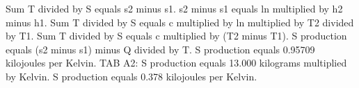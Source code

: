 Sum T divided by S equals s2 minus s1.  
s2 minus s1 equals ln multiplied by h2 minus h1.  
Sum T divided by S equals c multiplied by ln multiplied by T2 divided by T1.  
Sum T divided by S equals c multiplied by (T2 minus T1).  
S production equals (s2 minus s1) minus Q divided by T.  
S production equals 0.95709 kilojoules per Kelvin.  
TAB A2:  
S production equals 13.000 kilograms multiplied by Kelvin.  
S production equals 0.378 kilojoules per Kelvin.